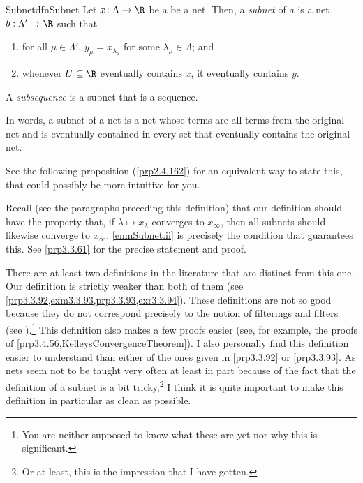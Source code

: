 \begin{dfn}{Subnet}{dfnSubnet}
Let $x\colon \Lambda \rightarrow \R$ be a be a net.  Then, a \emph{subnet} of $a$ is a net $b:\Lambda '\rightarrow \R$ such that
\begin{enumerate}
\item \label{enmSubnet.i}for all $\mu \in \Lambda '$, $y_\mu =x_{\lambda _\mu}$ for some $\lambda _\mu \in \Lambda$; and
\item \label{enmSubnet.ii}whenever $U\subseteq \R$ eventually contains $x$, it eventually contains $y$.
\end{enumerate}
A \emph{subsequence} is a subnet that is a sequence.
\begin{rmk}
In words, a subnet of a net is a net whose terms are all terms from the original net and is eventually contained in every set that eventually contains the original net.
\end{rmk}
\begin{rmk}
See the following proposition (\cref{prp2.4.162}) for an equivalent way to state this, that could possibly be more intuitive for you.
\end{rmk}
\begin{rmk}
Recall (see the paragraphs preceding this definition) that our definition should have the property that, if $\lambda \mapsto x_{\lambda}$ converges to $x_{\infty}$, then all subnets should likewise converge to $x_{\infty}$.  \cref{enmSubnet.ii} is precisely the condition that guarantees this.  See \cref{prp3.3.61} for the precise statement and proof.
\end{rmk}
\begin{rmk}
There are at least two definitions in the literature that are distinct from this one.  Our definition is strictly weaker than both of them (see \cref{prp3.3.92,exm3.3.93,prp3.3.93,exr3.3.94}).  These definitions are not so good because they do not correspond precisely to the notion of filterings and filters (see ).\footnote{You are neither supposed to know what these are yet nor why this is significant.}  This definition also makes a few proofs easier (see, for example, the proofs of \cref{prp3.4.56,KelleysConvergenceTheorem}).  I also personally find this definition easier to understand than either of the ones given in \cref{prp3.3.92} or \cref{prp3.3.93}.  As nets seem not to be taught very often at least in part because of the fact that the definition of a subnet is a bit tricky,\footnote{Or at least, this is the impression that I have gotten.} I think it is quite important to make this definition in particular as clean as possible.

\end{rmk}
\end{dfn}
